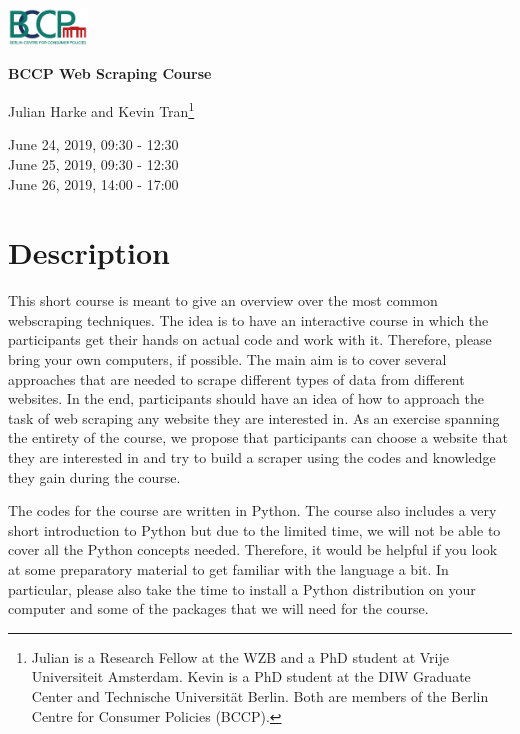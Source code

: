 \documentclass[a4paper]{article}
\begin{document}
\includegraphics[width=80px]{../misc/bccp_logo_transparent.png}
\vspace{1cm}

\begin{center}
\textbf{\Large BCCP Web Scraping Course} \vspace{0.3cm}

Julian Harke and Kevin Tran\footnote{Julian is a Research Fellow at the WZB and a PhD student at Vrije Universiteit Amsterdam. Kevin is a PhD student at the DIW Graduate Center and Technische Universit\"at Berlin. Both are members of the Berlin Centre for Consumer Policies (BCCP).} \vspace{0.3cm}

June 24, 2019, 09:30 - 12:30 \\
June 25, 2019, 09:30 - 12:30 \\
June 26, 2019, 14:00 - 17:00
\end{center}

\section{Description}

This short course is meant to give an overview over the most common webscraping techniques. The idea is to have an interactive course in which the participants get their hands on actual code and work with it. Therefore, please bring your own computers, if possible. The main aim is to cover several approaches that are needed to scrape different types of data from different websites. In the end, participants should have an idea of how to approach the task of web scraping any website they are interested in.
As an exercise spanning the entirety of the course, we propose that participants can choose a website that they are interested in and try to build a scraper using the codes and knowledge they gain during the course.

The codes for the course are written in Python. The course also includes a very short introduction to Python but due to the limited time, we will not be able to cover all the Python concepts needed. Therefore, it would be helpful if you look at some preparatory material to get familiar with the language a bit. In particular, please also take the time to install a Python distribution on your computer and some of the packages that we will need for the course.
\end{document}
